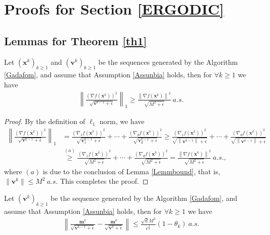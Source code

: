 \documentclass[twoside,11pt]{article}
\begin{document}
\section{Proofs for Section \ref{ERGODIC}}
\subsection{Lemmas for Theorem \ref{th1}}
\begin{lemma}\label{LemGlow}
Let $(\mathbf{x}^k)_{k\ge 1}$ and $({\mathbf{v}}^k)_{k\ge 1}$ be the sequences generated by the Algorithm \ref{Gadafom}, and assume that Assumption \ref{Assunbia} holds, then for $\forall k\ge 1$ we have
\begin{align}\label{LemGlow.1}
   	\left\|  \frac{(\nabla f(\mathbf{x}^k))^2}{\sqrt{\mathbf{v}^{k-1}+\epsilon}} \right\|_1  \ge \frac{\left\| \nabla f(\mathbf{x}^k)\right\|^2}{\sqrt{M^2+\epsilon}}\ a.s.
   	\end{align}
\end{lemma}
   \begin{proof}
   	By the definition of $\ell_1$ norm, we have
   	\begin{equation}
   	\begin{aligned}
   	\left\|  \frac{(\nabla f(\mathbf{x}^k))^2}{\sqrt{\mathbf{v}^{k-1}+\epsilon}} \right\|_1
   	&=\frac{(\nabla_{1}  f(\mathbf{x}^k))^2}{\sqrt{\mathbf{v}^{k-1}_1+\epsilon}}
   	+\cdots+\frac{(\nabla_{d}  f(\mathbf{x}^k))^2}{\sqrt{\mathbf{v}^{k-1}_d+\epsilon}}
   	\ge\frac{(\nabla_{1}  f(\mathbf{x}^k))^2}{\sqrt{\left\| \mathbf{v}^{k-1}\right\| +\epsilon}}
   	+\cdots+\frac{(\nabla_{d}  f(\mathbf{x}^k))^2}{\sqrt{\left\| \mathbf{v}^{k-1}\right\| +\epsilon}}\\
   	&\overset{(a)}{\ge}\frac{(\nabla_{1}  f(\mathbf{x}^k))^2}{\sqrt{M^2+\epsilon}}
   	+\cdots+\frac{(\nabla_{d}  f(\mathbf{x}^k))^2}{\sqrt{M^2+\epsilon}}=\frac{\left\| \nabla f(\mathbf{x}^k)\right\|^2}{\sqrt{M^2+\epsilon}}\ a.s.,\nonumber
   	\end{aligned}
\end{equation}
where $(a)$ is due to the conclusion of Lemma \ref{Lemmbound},  that is,  $\lVert\mathbf{v}^k \rVert \le M^2\ a.s.$ This completes the proof.
\end{proof}
\begin{lemma}\label{yogiLem}
Let $({\mathbf{v}}^k)_{k\ge 1}$ be the sequence generated by the Algorithm \ref{Gadafom}, and assume that Assumption \ref{Assunbia} holds, then for $\forall k\ge 1$ we have
\begin{equation}\label{yogiLem.1}
   	\begin{aligned}
   	\left\| \frac{\mathbf{m}^k}{\sqrt{\mathbf{v}^{k-1}+\epsilon}}-\frac{\mathbf{m}^k}{\sqrt{\mathbf{v}^{k}+\epsilon}}\right\|
   	\le \frac{\sqrt{d}M^3}{\epsilon^{\frac{3}{2}}}(1-\theta_k)\ a.s.
   	\end{aligned}
\end{equation}
   	
\end{lemma}
   
\end{document}
